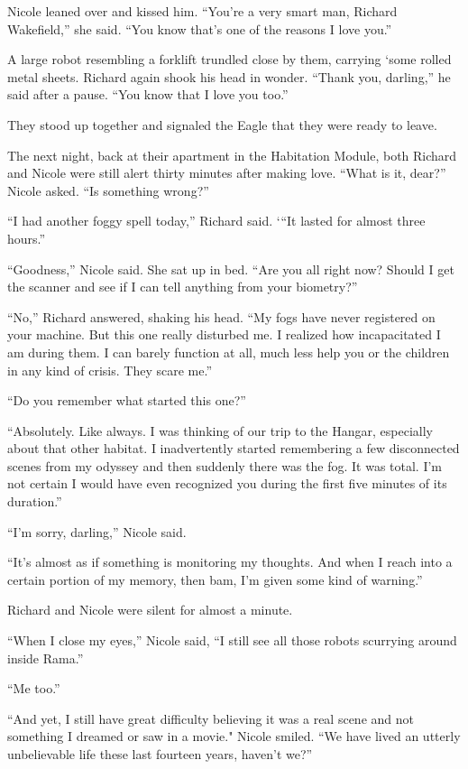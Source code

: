 \documentclass[]{article}
\begin{document}
{Nicole leaned over and kissed him.  “You’re a very smart man, Richard Wakefield,” she said.  “You know that’s one of the reasons I love you.”

A large robot resembling a forklift trundled close by them, carrying ‘some rolled metal sheets.  Richard again shook his head in wonder.  “Thank you, darling,” he said after a pause.  “You know that I love you too.”

They stood up together and signaled the Eagle that they were ready to leave.

The next night, back at their apartment in the Habitation Module, both Richard and Nicole were still alert thirty minutes after making love.  “What is it, dear?” Nicole asked.  “Is something wrong?”

“I had another foggy spell today,” Richard said.  ‘“It lasted for almost three hours.”

“Goodness,” Nicole said.  She sat up in bed.  “Are you all right now? Should I get the scanner and see if I can tell anything from your biometry?”

“No,” Richard answered, shaking his head.  “My fogs have never registered on your machine.  But this one really disturbed me.  I realized how incapacitated I am during them.  I can barely function at all, much less help you or the children in any kind of crisis.  They scare me.”

“Do you remember what started this one?”

“Absolutely.  Like always.  I was thinking of our trip to the Hangar, especially about that other habitat.  I inadvertently started remembering a few disconnected scenes from my odyssey and then suddenly there was the fog.  It was total.  I’m not certain I would have even recognized you during the first five minutes of its duration.”

“I’m sorry, darling,” Nicole said.

“It’s almost as if something is monitoring my thoughts.  And when I reach into a certain portion of my memory, then bam, I’m given some kind of warning.”

Richard and Nicole were silent for almost a minute.

“When I close my eyes,” Nicole said, “I still see all those robots scurrying around inside Rama.”

“Me too.”

“And yet, I still have great difficulty believing it was a real scene and not something I dreamed or saw in a movie."  Nicole smiled.  “We have lived an utterly unbelievable life these last fourteen years, haven’t we?”

}
\end{document}
